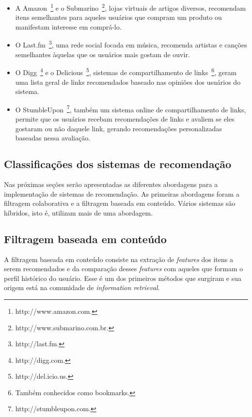 \begin{itemize}
\item 
A Amazon~\footnote{http://www.amazon.com.} e o Submarino~\footnote{http://www.submarino.com.br.}, lojas virtuais de artigos diversos, recomendam itens semelhantes para aqueles usuários que compram um produto ou manifestam interesse em comprá-lo.

\item O Last.fm~\footnote{http://last.fm.}, uma rede social focada em música, recomenda artistas e canções semelhantes àquelas que os usuários mais gostam de ouvir.

\item O Digg~\footnote{http://digg.com.} e o Delicious~\footnote{http://del.icio.us.}, sistemas de compartilhamento de links~\footnote{Também conhecidos como bookmarks.}, geram uma lista geral de links recomendados baseado nas opiniões dos usuários do sistema.

\item O StumbleUpon~\footnote{http://stumbleupon.com.}, também um sistema online de compartilhamento de links, permite que os usuários recebam recomendações de links e avaliem se eles gostaram ou não daquele link, gerando recomendações personalizadas baseadas nessa avaliação.
\end{itemize}


\subsection{Classificações dos sistemas de recomendação}

Nas próximas seções serão apresentadas as diferentes abordagens para a implementação de sistemas de recomendação. As primeiras abordagens foram a filtragem colaborativa e a filtragem baseada em conteúdo. Vários sistemas são híbridos, isto é, utilizam mais de uma abordagem.


\subsection{Filtragem baseada em conteúdo} %
A filtragem baseada em conteúdo consiste na extração de \textit{features} dos itens a serem recomendados e da comparação desses \textit{features} com aqueles que formam o  perfil histórico do usuário. Esse é um dos primeiros métodos que surgiram e sua origem está na comunidade de \textit{information retrieval}.~\cite{Balabanovi97}

